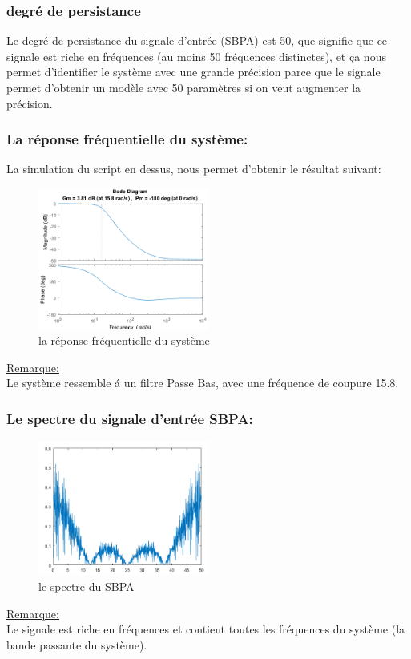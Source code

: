 \documentclass[twoside,twocolumn]{article}
\begin{document}
\subsubsection{degré de persistance}
Le degré de persistance du signale d'entrée (SBPA) est 50, que signifie que ce signale est riche en fréquences (au moins 50 fréquences distinctes), et ça nous permet d'identifier le système avec une grande précision parce que le signale permet d'obtenir un modèle avec 50 paramètres si on veut augmenter la précision.


\subsubsection{La réponse fréquentielle du système:}
La simulation du script en dessus, nous permet d'obtenir le résultat suivant:
\begin{figure}[H]
\centering
\includegraphics[width=0.5\textwidth]{Images/2.png}
\caption{ la réponse fréquentielle du système}
\end{figure}
\underline{Remarque:}\\
Le système ressemble á un filtre Passe Bas, avec une fréquence de coupure 15.8.

\subsubsection{Le spectre du signale d'entrée SBPA:}
\begin{figure}[H]
\centering
\includegraphics[width=0.5\textwidth]{Images/3.png}
\caption{ le spectre du SBPA}
\end{figure}
\underline{Remarque:}\\
Le signale est riche en fréquences et contient toutes les fréquences du système (la bande passante du système).
\end{document}

